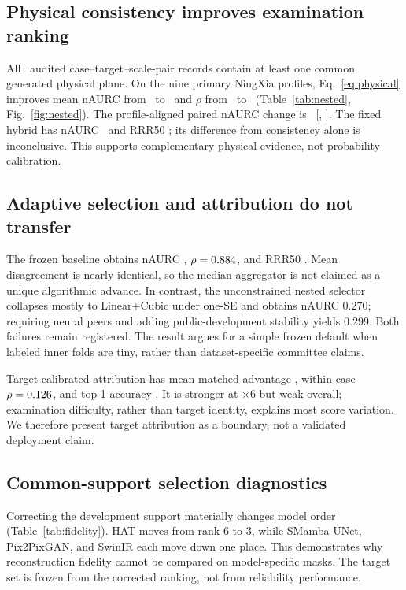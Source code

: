 \documentclass{article}
\begin{document}
\subsection{Physical consistency improves examination ranking}
All \PhysicalMatchedRecords\ audited case--target--scale-pair records contain at least one common generated physical plane. On the nine primary NingXia profiles, Eq.~\eqref{eq:physical} improves mean nAURC from \NestedBaselineNAURC\ to \NestedTriageNAURC\ and $\rho$ from \NestedBaselineRho\ to \NestedTriageRho\ (Table~\ref{tab:nested}, Fig.~\ref{fig:nested}). The profile-aligned paired nAURC change is \NestedDeltaNAURC\ [\NestedDeltaNAURCLo, \NestedDeltaNAURCHi]. The fixed hybrid has nAURC \NestedLowNAURC\ and RRR50 \NestedLowRRR; its difference from consistency alone is inconclusive. This supports complementary physical evidence, not probability calibration.

\subsection{Adaptive selection and attribution do not transfer}
The frozen baseline obtains nAURC \NestedBaselineNAURC, $\rho=0.884$, and RRR50 \NestedBaselineRRR. Mean disagreement is nearly identical, so the median aggregator is not claimed as a unique algorithmic advance. In contrast, the unconstrained nested selector collapses mostly to Linear+Cubic under one-SE and obtains nAURC 0.270; requiring neural peers and adding public-development stability yields 0.299. Both failures remain registered. The result argues for a simple frozen default when labeled inner folds are tiny, rather than dataset-specific committee claims.

Target-calibrated attribution has mean matched advantage \NestedAttrAdv, within-case $\rho=0.126$, and top-1 accuracy \NestedAttrTop. It is stronger at $\times6$ but weak overall; examination difficulty, rather than target identity, explains most score variation. We therefore present target attribution as a boundary, not a validated deployment claim.

\subsection{Common-support selection diagnostics}
Correcting the development support materially changes model order (Table~\ref{tab:fidelity}). HAT moves from rank 6 to 3, while SMamba-UNet, Pix2PixGAN, and SwinIR each move down one place. This demonstrates why reconstruction fidelity cannot be compared on model-specific masks. The target set is frozen from the corrected ranking, not from reliability performance.
\end{document}
